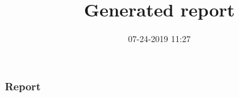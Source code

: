 \documentclass[slidestop]{beamer}
\numberwithin{equation}{section}
\begin{document}

\part{ }


\title[CIRL Generated Report]{Generated report}

\author{}

\institute{}

\date{07-24-2019 11:27}

\frame{\titlepage}

\section{Report}
\end{document}
